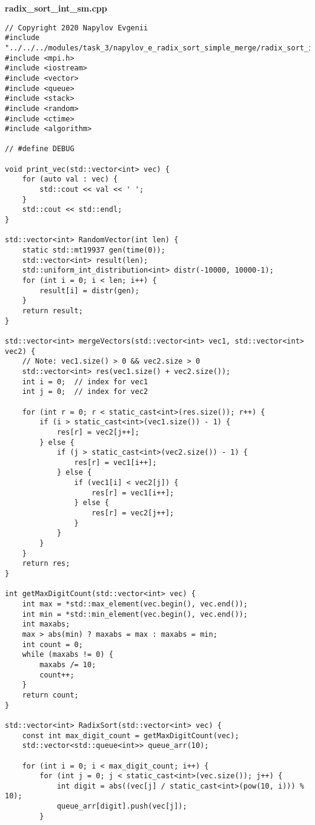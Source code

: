 \documentclass{report}
\begin{document}
	\textbf{radix\_sort\_int\_sm.cpp}
	\begin{lstlisting}
// Copyright 2020 Napylov Evgenii
#include "../../../modules/task_3/napylov_e_radix_sort_simple_merge/radix_sort_int_sm.h"
#include <mpi.h>
#include <iostream>
#include <vector>
#include <queue>
#include <stack>
#include <random>
#include <ctime>
#include <algorithm>

// #define DEBUG

void print_vec(std::vector<int> vec) {
    for (auto val : vec) {
        std::cout << val << ' ';
    }
    std::cout << std::endl;
}

std::vector<int> RandomVector(int len) {
    static std::mt19937 gen(time(0));
    std::vector<int> result(len);
    std::uniform_int_distribution<int> distr(-10000, 10000-1);
    for (int i = 0; i < len; i++) {
        result[i] = distr(gen);
    }
    return result;
}

std::vector<int> mergeVectors(std::vector<int> vec1, std::vector<int> vec2) {
    // Note: vec1.size() > 0 && vec2.size > 0
    std::vector<int> res(vec1.size() + vec2.size());
    int i = 0;  // index for vec1
    int j = 0;  // index for vec2

    for (int r = 0; r < static_cast<int>(res.size()); r++) {
        if (i > static_cast<int>(vec1.size()) - 1) {
            res[r] = vec2[j++];
        } else {
            if (j > static_cast<int>(vec2.size()) - 1) {
                res[r] = vec1[i++];
            } else {
                if (vec1[i] < vec2[j]) {
                    res[r] = vec1[i++];
                } else {
                    res[r] = vec2[j++];
                }
            }
        }
    }
    return res;
}

int getMaxDigitCount(std::vector<int> vec) {
    int max = *std::max_element(vec.begin(), vec.end());
    int min = *std::min_element(vec.begin(), vec.end());
    int maxabs;
    max > abs(min) ? maxabs = max : maxabs = min;
    int count = 0;
    while (maxabs != 0) {
        maxabs /= 10;
        count++;
    }
    return count;
}

std::vector<int> RadixSort(std::vector<int> vec) {
    const int max_digit_count = getMaxDigitCount(vec);
    std::vector<std::queue<int>> queue_arr(10);

    for (int i = 0; i < max_digit_count; i++) {
        for (int j = 0; j < static_cast<int>(vec.size()); j++) {
            int digit = abs((vec[j] / static_cast<int>(pow(10, i))) % 10);
            queue_arr[digit].push(vec[j]);
        }


\end{lstlisting}
\end{document}
